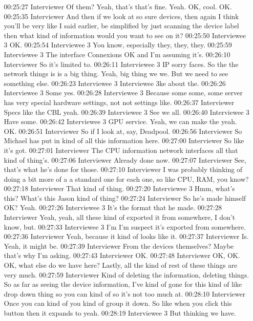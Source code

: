 00:25:27 Interviewer
Of them? Yeah, that's that's fine. Yeah. OK, cool. OK.
00:25:35 Interviewer
And then if we look at so sure devices, then again I think you'll be very like I said earlier, be simplified by just scanning the device label then what kind of information would you want to see on it?
00:25:50 Interviewee 3
OK.
00:25:54 Interviewee 3
You know, especially they, they, they.
00:25:59 Interviewee 3
The interface Connexions OK and I'm assuming it's.
00:26:10 Interviewer
So it's limited to.
00:26:11 Interviewee 3
IP sorry faces. So the the network things is is a big thing. Yeah, big thing we we. But we need to see something else.
00:26:23 Interviewee 3
Interviewee 3ke about the.
00:26:26 Interviewee 3
Some yes.
00:26:28 Interviewee 3
Because some some, some server has very special hardware settings, not not settings like.
00:26:37 Interviewer
Specs like the CBL yeah.
00:26:39 Interviewee 3
See we all.
00:26:40 Interviewee 3
Have some.
00:26:42 Interviewee 3
GPU service. Yeah, we can make the yeah. OK.
00:26:51 Interviewer
So if I look at, say, Deadpool.
00:26:56 Interviewer
So Michael has put in kind of all this information here.
00:27:00 Interviewer
So like it's got.
00:27:01 Interviewer
The CPU information network interfaces all that kind of thing's.
00:27:06 Interviewer
Already done now.
00:27:07 Interviewer
See, that's what he's done for those.
00:27:10 Interviewer
I was probably thinking of doing a bit more of a a standard one for each one, so like CPU, RAM, you know?
00:27:18 Interviewer
That kind of thing.
00:27:20 Interviewee 3
Hmm, what's this? What's this Jason kind of thing?
00:27:24 Interviewer
So he's made himself OK? Yeah.
00:27:26 Interviewee 3
It's the format that he made.
00:27:28 Interviewer
Yeah, yeah, all these kind of exported it from somewhere, I don't know, but.
00:27:33 Interviewee 3
I'm I'm suspect it's exported from somewhere.
00:27:36 Interviewer
Yeah, because it kind of looks like it.
00:27:37 Interviewer
Is. Yeah, it might be.
00:27:39 Interviewer
From the devices themselves? Maybe that's why I'm asking.
00:27:43 Interviewer
OK.
00:27:48 Interviewer
OK, OK. OK, what else do we have here? Lastly, all the kind of rest of these things are very much.
00:27:59 Interviewer
Kind of deleting the information, deleting things. So as far as seeing the device information, I've kind of gone for this kind of like drop down thing so you can kind of so it's not too much at.
00:28:10 Interviewer
Once you can kind of you kind of group it down. So like when you click this button then it expands to yeah.
00:28:19 Interviewee 3
But thinking we have.
